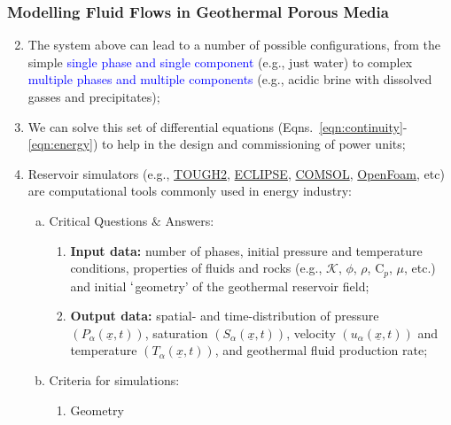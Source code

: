 \documentclass[10pt,compress]{beamer}
\newcommand{\blue}{\textcolor{blue}}
\begin{document}
\begin{frame}
 \frametitle{Modelling Fluid Flows in Geothermal Porous Media}
         \begin{enumerate}[1.]\setcounter{enumi}{1}\scriptsize
            \item <1-> The system above can lead to a number of possible configurations, from the simple \blue{single phase and single component} (e.g., just water) to complex \blue{multiple phases and multiple components} (e.g., acidic brine with dissolved gasses and precipitates);
            \item <2-> We can solve this set of differential equations (Eqns.~\ref{eqn:continuity}-\ref{eqn:energy}) to help in the design and commissioning of power units;
            \item <3-> Reservoir simulators (e.g., \href{http://esd1.lbl.gov/research/projects/tough/software/tough2.html}{TOUGH2}, \href{http://www.software.slb.com/products/foundation/pages/eclipse.aspx}{ECLIPSE}, \href{http://www.uk.comsol.com/}{COMSOL}, \href{http://www.openfoam.com/} {OpenFoam}, etc) are computational tools commonly used in energy industry:
               \begin{enumerate}[(a)]\scriptsize
                   \item <4-> Critical Questions $\&$ Answers:
                       \begin{enumerate}[{a.}i)]\scriptsize
                          \item <4-> {\bf Input data:} number of phases, initial pressure and temperature conditions, properties of fluids and rocks (e.g., $\mathcal{K}$, $\phi$, $\rho$, C$_{p}$, $\mu$, etc.) and initial $\lq$geometry' of the geothermal reservoir field;
                          \item <5-> {\bf Output data:} spatial- and time-distribution of pressure $\left(P_{\alpha}\left(\underline{x},t\right)\right)$, saturation $\left(S_{\alpha}\left(\underline{x},t\right)\right)$, velocity $\left(u_{\alpha}\left(\underline{x},t\right)\right)$ and  temperature $\left(T_{\alpha}\left(\underline{x},t\right)\right)$, and geothermal fluid production rate;
                       \end{enumerate}
                   \item <6-> Criteria for simulations:
                       \begin{enumerate}[{b.}i)]\scriptsize
                          \item <6-> Geometry
                       \end{enumerate}
               \end{enumerate}
         \end{enumerate}
\end{frame}
\end{document}
